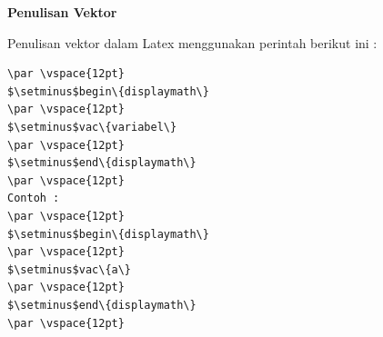 \textbf{Penulisan Vektor}\par \vspace{12pt}

Penulisan vektor dalam Latex menggunakan perintah berikut ini :
\begin{verbatim}
\par \vspace{12pt}
$\setminus$begin\{displaymath\}
\par \vspace{12pt}
$\setminus$vac\{variabel\}
\par \vspace{12pt}
$\setminus$end\{displaymath\}
\par \vspace{12pt}
Contoh :
\par \vspace{12pt}
$\setminus$begin\{displaymath\}
\par \vspace{12pt}
$\setminus$vac\{a\}
\par \vspace{12pt}
$\setminus$end\{displaymath\}
\par \vspace{12pt}
\end{verbatim}

